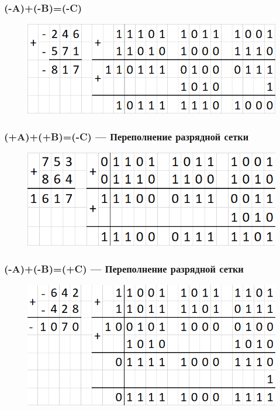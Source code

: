 \documentclass[a4paper,14pt]{article}
\begin{document}
\subsubsection{(-A)+(-B)=(-C)}

\begin{figure}[H]
	\centering
	\includegraphics[width=0.7\linewidth]{images/ex4}
	\caption{}
	\label{fig:ex4}
\end{figure}



\subsubsection{(+A)+(+B)=(-C) — Переполнение разрядной сетки}

\begin{figure}[H]
	\centering
	\includegraphics[width=0.7\linewidth]{images/ex5}
	\caption{}
	\label{fig:ex5}
\end{figure}




\subsubsection{(-A)+(-B)=(+C) — Переполнение разрядной сетки}

\begin{figure}[H]
	\centering
	\includegraphics[width=0.7\linewidth]{images/ex6}
	\caption{}
	\label{fig:ex6}
\end{figure}
\end{document}
